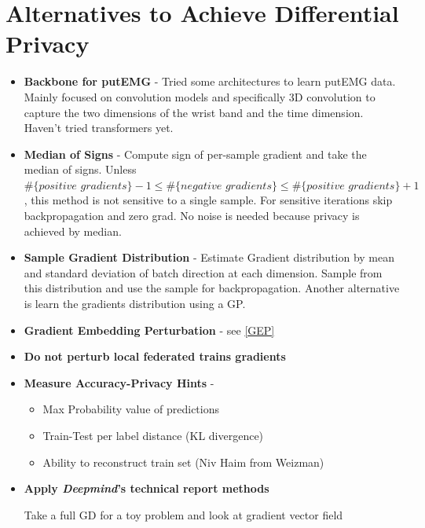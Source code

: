 \section{Alternatives to Achieve Differential Privacy}
\begin{itemize}

    \item \textbf{Backbone for putEMG} - Tried some architectures to learn putEMG data. Mainly focused on convolution models and specifically 3D convolution to capture the two dimensions of the wrist band and the time dimension. Haven't tried transformers yet.

    \item \textbf{Median of Signs} -  Compute sign of per-sample gradient and take the median of signs. Unless \\ $\#\{ \textit{positive gradients}\} - 1 \leq \#\{\textit{negative gradients}\} \leq \#\{\textit{positive gradients}\} + 1 $, this method is not sensitive to a single sample. For sensitive iterations skip backpropagation and zero grad. No noise is needed because privacy is achieved by median.

    \item \textbf{Sample Gradient Distribution} - Estimate Gradient distribution by mean and standard deviation of batch direction at each dimension. Sample from this distribution and use the sample for backpropagation. Another alternative is learn the gradients distribution using a GP.

    \item \textbf{Gradient Embedding Perturbation} - see \ref{GEP}

    \item \textbf{Do not perturb local federated trains gradients}

    \item  \textbf{Measure Accuracy-Privacy Hints} - 
    \begin{itemize}
        \item Max Probability value of predictions
        \item Train-Test per label distance (KL divergence)
        \item Ability to reconstruct train set (Niv Haim from Weizman)
    \end{itemize}  

    \item \textbf{Apply \textit{Deepmind}'s technical report \cite{DeUnlockingScale} methods}
    

     Take a full GD for a toy problem and look at gradient vector field
    
\end{itemize}

